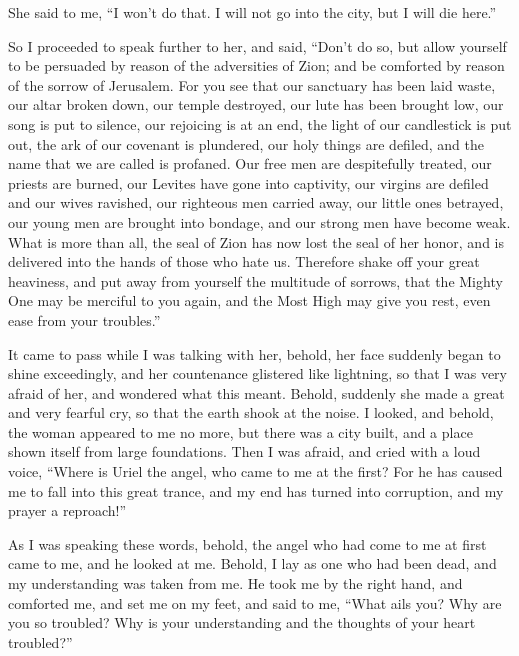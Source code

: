  She said to me, ``I won't do that. I will not go into
the city, but I will die here.''

 So I proceeded to speak further to her, and said,
 ``Don't do so, but allow yourself to be persuaded by
reason of the adversities of Zion; and be comforted by reason of the
sorrow of Jerusalem.  For you see that our sanctuary has
been laid waste, our altar broken down, our temple destroyed,
 our lute has been brought low, our song is put to
silence, our rejoicing is at an end, the light of our candlestick is put
out, the ark of our covenant is plundered, our holy things are defiled,
and the name that we are called is profaned. Our free men are
despitefully treated, our priests are burned, our Levites have gone into
captivity, our virgins are defiled and our wives ravished, our righteous
men carried away, our little ones betrayed, our young men are brought
into bondage, and our strong men have become weak.  What
is more than all, the seal of Zion has now lost the seal of her honor,
and is delivered into the hands of those who hate us. 
Therefore shake off your great heaviness, and put away from yourself the
multitude of sorrows, that the Mighty One may be merciful to you again,
and the Most High may give you rest, even ease from your troubles.''

 It came to pass while I was talking with her, behold,
her face suddenly began to shine exceedingly, and her countenance
glistered like lightning, so that I was very afraid of her, and wondered
what this meant.  Behold, suddenly she made a great and
very fearful cry, so that the earth shook at the noise. 
I looked, and behold, the woman appeared to me no more, but there was a
city built, and a place shown itself from large foundations. Then I was
afraid, and cried with a loud voice,  ``Where is Uriel
the angel, who came to me at the first? For he has caused me to fall
into this great trance, and my end has turned into corruption, and my
prayer a reproach!''

 As I was speaking these words, behold, the angel who had
come to me at first came to me, and he looked at me. 
Behold, I lay as one who had been dead, and my understanding was taken
from me. He took me by the right hand, and comforted me, and set me on
my feet, and said to me,  ``What ails you? Why are you so
troubled? Why is your understanding and the thoughts of your heart
troubled?''

